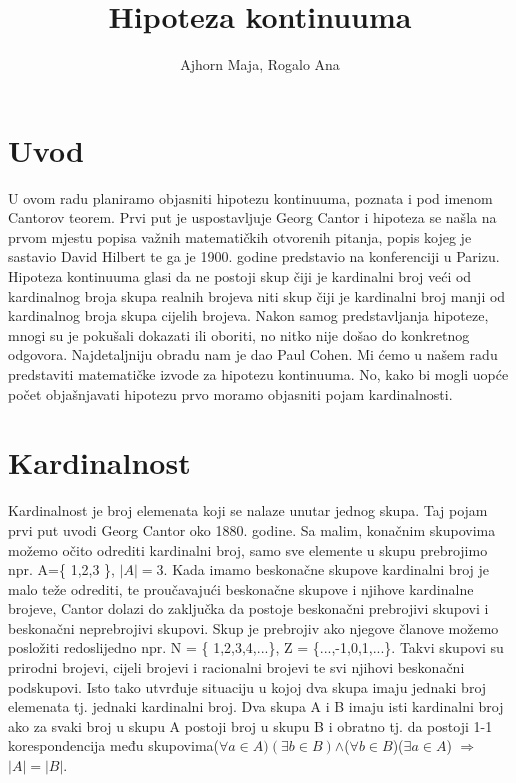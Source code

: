 \documentclass[12pt]{report}
\title{Hipoteza kontinuuma}
\author{Ajhorn Maja, Rogalo Ana}
\begin{document}
\maketitle
\onehalfspacing

\section{Uvod}
U ovom radu planiramo objasniti hipotezu kontinuuma, poznata i pod imenom Cantorov teorem. Prvi put je uspostavljuje Georg Cantor i hipoteza se našla na prvom mjestu popisa važnih matematičkih otvorenih pitanja, popis kojeg je sastavio David Hilbert te ga je 1900. godine predstavio na konferenciji u Parizu. Hipoteza kontinuuma glasi da ne postoji skup čiji je kardinalni broj veći od kardinalnog broja skupa realnih brojeva niti skup čiji je kardinalni broj manji od kardinalnog broja skupa cijelih brojeva. Nakon samog predstavljanja hipoteze, mnogi su je pokušali dokazati ili oboriti, no nitko nije došao do konkretnog odgovora. Najdetaljniju obradu nam je dao Paul Cohen. Mi ćemo u našem radu predstaviti matematičke izvode za hipotezu kontinuuma. No, kako bi mogli uopće počet objašnjavati hipotezu prvo moramo objasniti pojam kardinalnosti.

\section{Kardinalnost}
Kardinalnost je broj elemenata koji se nalaze unutar jednog skupa. Taj pojam prvi put uvodi Georg Cantor oko 1880. godine. Sa malim, konačnim skupovima možemo očito odrediti kardinalni broj, samo sve elemente u skupu prebrojimo npr. A=\{ 1,2,3 \}, $|A| = 3$. Kada imamo beskonačne skupove kardinalni broj je malo teže odrediti, te proučavajući beskonačne skupove i njihove kardinalne brojeve, Cantor dolazi do zaključka da postoje beskonačni prebrojivi skupovi i beskonačni neprebrojivi skupovi. Skup je prebrojiv ako njegove članove možemo posložiti redoslijedno npr. N = \{ 1,2,3,4,...\}, Z = \{...,-1,0,1,...\}. Takvi skupovi su prirodni brojevi, cijeli brojevi i racionalni brojevi te svi njihovi beskonačni podskupovi. Isto tako utvrđuje situaciju u kojoj dva skupa imaju jednaki broj elemenata tj. jednaki kardinalni broj. Dva skupa A i B imaju isti kardinalni broj ako za svaki broj u skupu A postoji broj u skupu B i obratno tj. da postoji 1-1 korespondencija među skupovima($\forall a \in A)(\exists b \in B)$$\wedge$($\forall b \in B$)($\exists a \in A$) $\Rightarrow$$|A|=|B|$. 
\end{document}
